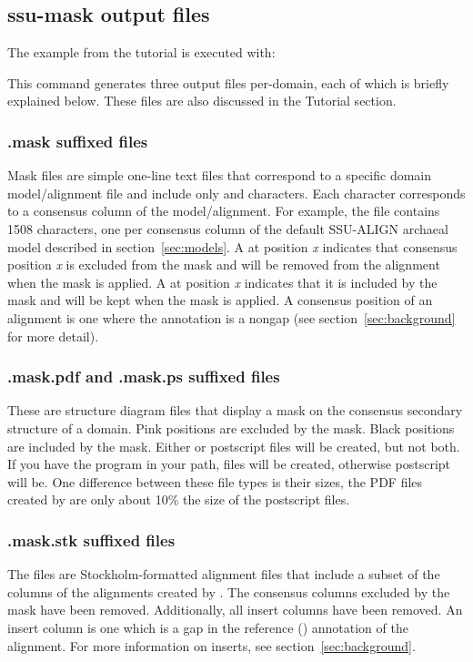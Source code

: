 \subsection{ssu-mask output files}

The  example from the tutorial is executed with:


This command generates three output files per-domain, each of which is
briefly explained below. These files are also discussed in the
Tutorial section. 

\subsubsection{.mask suffixed files}
Mask files are simple one-line text files that correspond to a
specific domain model/alignment file and include only  and
 characters. Each character corresponds to a consensus column
of the model/alignment. For example, the
 file contains 1508 characters, one per
consensus column of the default SSU-ALIGN archaeal model
described in section~\ref{sec:models}. A  at position \emph{x}
indicates that consensus position \emph{x} is excluded from the mask
and will be removed from the alignment when the mask is applied. A
 at position \emph{x} indicates that it is included by the
mask and will be kept when the mask is applied. A consensus position
of an alignment is one where the  annotation is a
nongap (see section~\ref{sec:background} for more detail).

\subsubsection{.mask.pdf and .mask.ps suffixed files}
These are structure diagram files that display a mask on the consensus
secondary structure of a domain. Pink positions are excluded by the
mask. Black positions are included by the mask. Either  or
postscript  files will be created, but not both. If you have
the program  in your path,  files will be
created, otherwise postscript will be. One difference between
these file types is their sizes, the PDF files created by
 are only about 10\% the size of the postscript files.

\subsubsection{.mask.stk suffixed files}
The  files are Stockholm-formatted alignment files
that include a subset of the columns of the alignments created by
. The consensus columns excluded by the mask have been
removed. Additionally, all insert columns have been removed. An insert
column is one which is a gap in the reference ()
annotation of the alignment. For more information on inserts, see
section~\ref{sec:background}.

